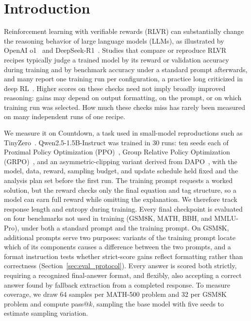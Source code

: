 \documentclass[ai,article,submit,oneauthor]{Definitions/mdpi}
\begin{document}
\section{Introduction}

Reinforcement learning with verifiable rewards (RLVR) can substantially change the reasoning behavior of large language models (LLMs), as illustrated by OpenAI o1~\cite{openai2024reasoning} and DeepSeek-R1~\cite{guo2025deepseek}. Studies that compare or reproduce RLVR recipes typically judge a trained model by its reward or validation accuracy during training and by benchmark accuracy under a standard prompt afterwards, and many report one training run per configuration, a practice long criticized in deep RL~\cite{henderson2018matters,agarwal2021precipice}. Higher scores on these checks need not imply broadly improved reasoning: gains may depend on output formatting, on the prompt, or on which training run was selected. How much these checks miss has rarely been measured on many independent runs of one recipe.

We measure it on Countdown, a task used in small-model reproductions such as TinyZero~\cite{pan2025tinyzero}. Qwen2.5-1.5B-Instruct was trained in 30 runs: ten seeds each of Proximal Policy Optimization (PPO)~\cite{schulman2017proximalpolicyoptimizationalgorithms}, Group Relative Policy Optimization (GRPO)~\cite{shao2024deepseekmathpushinglimitsmathematical}, and an asymmetric-clipping variant derived from DAPO~\cite{yu2025dapo}, with the model, data, reward, sampling budget, and update schedule held fixed and the analysis plan set before the first run. The training prompt requests a worked solution, but the reward checks only the final equation and tag structure, so a model can earn full reward while omitting the explanation. We therefore track response length and entropy during training. Every final checkpoint is evaluated on four benchmarks not used in training (GSM8K, MATH, BBH, and MMLU-Pro), under both a standard prompt and the training prompt. On GSM8K, additional prompts serve two purposes: variants of the training prompt locate which of its components causes a difference between the two prompts, and a format instruction tests whether strict-score gains reflect formatting rather than correctness (Section~\ref{sec:eval_protocol}). Every answer is scored both strictly, requiring a recognized final-answer format, and flexibly, also accepting a correct answer found by fallback extraction from a completed response. To measure coverage, we draw 64 samples per MATH-500 problem and 32 per GSM8K problem and compute pass@$k$, sampling the base model with five seeds to estimate sampling variation.
\end{document}
